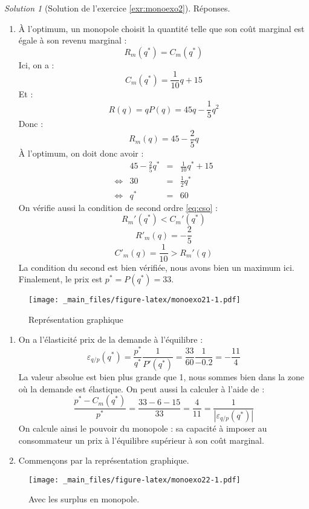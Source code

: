 \documentclass[
]{book}
\providecommand{\tightlist}{%
  \setlength{\itemsep}{0pt}\setlength{\parskip}{0pt}}
\theoremstyle{definition}
\theoremstyle{definition}
\theoremstyle{definition}
\theoremstyle{definition}
\theoremstyle{remark}
\newtheorem*{solution}{Solution}
\begin{document}
\begin{solution}[Solution de l'exercice \ref{exr:monoexo2}]

Réponses.

\begin{enumerate}
\def\labelenumi{\arabic{enumi}.}
\tightlist
\item
  À l'optimum, un monopole choisit la quantité telle que son coût marginal est égale à son revenu marginal :
  \[R_m(q^*)=C_m(q^*)\]
  Ici, on a :
  \[C_m(q^*)=\frac{1}{10}q+15\]
  Et :
  \[R(q) =qP(q)=45q-\frac{1}{5}q^2\]
  Donc :
  \[R_m(q)=45-\frac{2}{5}q\]
  À l'optimum, on doit donc avoir :
  \[
  \begin{array}{crcl}
  &45-\frac{2}{5}q^*&=&\frac{1}{10}q^*+15\\
  \Leftrightarrow & 30&=&\frac{1}{2}q^*\\
  \Leftrightarrow & q^*&=&60
  \end{array}
  \]
  On vérifie aussi la condition de second ordre \eqref{eq:cso} :
  \[R_m'(q^*)<C_m'(q^*)\]
  \[R'_m(q)=-\frac{2}{5}\]
  \[C'_m(q)=\frac{1}{10}>R_m'(q)\]
  La condition du second est bien vérifiée, nous avons bien un maximum ici.
  Finalement, le prix est \(p^*=P(q^*)=33\).
\end{enumerate}

\begin{figure}
\centering
\texttt{[image: \_main\_files/figure-latex/monoexo21-1.pdf]}
\caption{\label{fig:monoexo21}Représentation graphique}
\end{figure}

\begin{enumerate}
\def\labelenumi{\arabic{enumi}.}
\setcounter{enumi}{2}
\item
  On a l'élasticité prix de la demande à l'équilibre :
  \[\varepsilon_{q/p}(q^*)=\frac{p^*}{q^*}\frac{1}{P'(q^*)}=\frac{33}{60}\frac{1}{-0.2}=-\frac{11}{4}\]
  La valeur absolue est bien plus grande que 1, nous sommes bien dans la zone où la demande est élastique.
  On peut aussi la calculer à l'aide de :
  \[\frac{p^*-C_m(q^*)}{p^*}=\frac{33-6-15}{33}=\frac{4}{11}=\frac{1}{|\varepsilon_{q/p}(q^*)|}\]
  On calcule ainsi le pouvoir du monopole : sa capacité à imposer au consommateur un prix à l'équilibre supérieur à son coût marginal.
\item
  Commençons par la représentation graphique.
\end{enumerate}

\begin{figure}
\centering
\texttt{[image: \_main\_files/figure-latex/monoexo22-1.pdf]}
\caption{\label{fig:monoexo22}Avec les surplus en monopole.}
\end{figure}


\end{solution}
\end{document}
